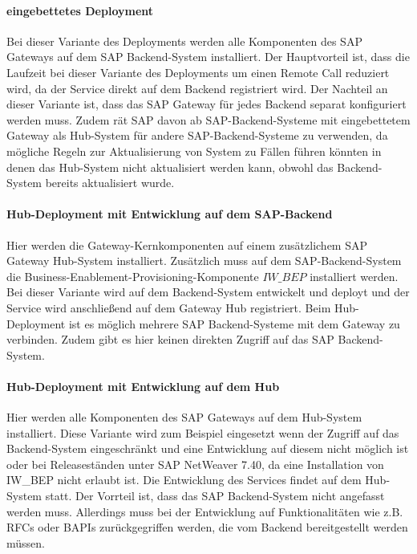 \paragraph{eingebettetes Deployment}
Bei dieser Variante des Deployments werden alle Komponenten des SAP Gateways auf dem SAP Backend-System installiert. Der Hauptvorteil ist, dass die Laufzeit bei dieser Variante des Deployments um einen Remote Call reduziert wird, da der Service direkt auf dem Backend registriert wird. Der Nachteil an dieser Variante ist, dass das SAP Gateway für jedes Backend separat konfiguriert werden muss. Zudem rät SAP davon ab SAP-Backend-Systeme mit eingebettetem Gateway als Hub-System für andere SAP-Backend-Systeme zu verwenden, da mögliche Regeln zur Aktualisierung von System zu Fällen führen könnten in denen das  Hub-System nicht aktualisiert werden kann, obwohl das Backend-System bereits aktualisiert wurde\cite[S.\ 52-54]{BoennenDreesFischerHeinzStrothmann2014}.
 
\paragraph{Hub-Deployment mit Entwicklung auf dem SAP-Backend}
Hier werden die Gateway-Kernkomponenten auf einem zusätzlichem SAP Gateway Hub-System installiert. Zusätzlich muss auf dem SAP-Backend-System die Business-Enablement-Provisioning-Komponente \(IW\_BEP\) installiert werden. Bei dieser Variante wird auf dem Backend-System entwickelt und deployt und der Service wird anschließend auf dem Gateway Hub registriert. Beim Hub-Deployment ist es möglich mehrere SAP Backend-Systeme mit dem Gateway zu verbinden. 
Zudem gibt es hier keinen direkten Zugriff auf das SAP Backend-System\cite[S.\ 54]{BoennenDreesFischerHeinzStrothmann2014}.

\paragraph{Hub-Deployment mit Entwicklung auf dem Hub}
Hier werden alle Komponenten des SAP Gateways auf dem Hub-System installiert. Diese Variante wird zum Beispiel eingesetzt wenn der Zugriff auf das Backend-System eingeschränkt und eine Entwicklung auf diesem nicht möglich ist oder bei Releaseständen unter SAP NetWeaver 7.40, da eine Installation von IW\_BEP nicht erlaubt ist. Die Entwicklung des Services findet auf dem Hub-System statt. Der Vorrteil ist, dass das SAP Backend-System nicht angefasst werden muss. Allerdings muss bei der Entwicklung auf Funktionalitäten wie z.B. RFCs oder BAPIs zurückgegriffen werden, die vom Backend bereitgestellt werden müssen\cite[S.\ 55]{BoennenDreesFischerHeinzStrothmann2014}.



